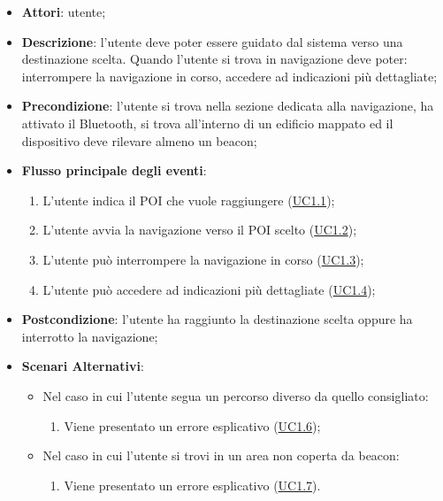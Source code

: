 \documentclass[../AnalisiDeiRequisiti.tex]{subfiles}
\begin{document}
\begin{itemize}
\item \textbf{Attori}: utente;
\item \textbf{Descrizione}: l'utente deve poter essere guidato dal sistema verso una destinazione scelta. Quando l'utente si trova in navigazione deve poter: interrompere la navigazione in corso, accedere ad indicazioni più dettagliate; 
      \item \textbf{Precondizione}: l'utente si trova nella sezione dedicata alla navigazione, ha attivato il Bluetooth, si trova all'interno di un edificio mappato ed il dispositivo deve rilevare almeno un beacon;

        \item \textbf{Flusso principale degli eventi}:
          \begin{enumerate}
          \item L'utente indica il POI che vuole raggiungere (\hyperlink{UC1.1}{UC1.1});
          \item L'utente avvia la navigazione verso il POI scelto (\hyperlink{UC1.2}{UC1.2});
          \item L'utente può interrompere la navigazione in corso  (\hyperlink{UC1.3}{UC1.3});
          \item L'utente può accedere ad indicazioni più dettagliate  (\hyperlink{UC1.4}{UC1.4});

      \end{enumerate}
	\item \textbf{Postcondizione}: l'utente ha raggiunto la destinazione scelta oppure ha interrotto la navigazione;
    \item \textbf{Scenari Alternativi}:
    	\begin{itemize}
      		\item Nel caso in cui l'utente segua un percorso diverso da quello consigliato:
      		\begin{enumerate}
         		\item Viene presentato un errore esplicativo (\hyperlink{UC1.6}{UC1.6});
      		\end{enumerate}
      		\item Nel caso in cui l'utente si trovi in un area non coperta da beacon:
      		\begin{enumerate}
         		\item Viene presentato un errore esplicativo (\hyperlink{UC1.7}{UC1.7}).
      		\end{enumerate}
      	\end{itemize}

  \end{itemize}
\hypertarget{UC1.1}{}
\end{document}
